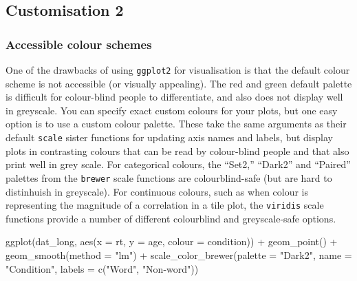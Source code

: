 \documentclass[
  english,
  doc,floatsintext]{apa6}
\newenvironment{Shaded}{\begin{snugshade}}{\end{snugshade}}
\newcommand{\AttributeTok}[1]{\textcolor[rgb]{0.77,0.63,0.00}{#1}}
\newcommand{\FunctionTok}[1]{\textcolor[rgb]{0.00,0.00,0.00}{#1}}
\newcommand{\NormalTok}[1]{#1}
\newcommand{\SpecialCharTok}[1]{\textcolor[rgb]{0.00,0.00,0.00}{#1}}
\newcommand{\StringTok}[1]{\textcolor[rgb]{0.31,0.60,0.02}{#1}}
\begin{document}
\hypertarget{customisation-2}{%
\subsection{Customisation 2}\label{customisation-2}}

\hypertarget{accessible-colour-schemes}{%
\subsubsection{Accessible colour schemes}\label{accessible-colour-schemes}}

One of the drawbacks of using \texttt{ggplot2} for visualisation is that the default colour scheme is not accessible (or visually appealing). The red and green default palette is difficult for colour-blind people to differentiate, and also does not display well in greyscale. You can specify exact custom colours for your plots, but one easy option is to use a custom colour palette. These take the same arguments as their default \texttt{scale} sister functions for updating axis names and labels, but display plots in contrasting colours that can be read by colour-blind people and that also print well in grey scale. For categorical colours, the ``Set2,'' ``Dark2'' and ``Paired'' palettes from the \texttt{brewer} scale functions are colourblind-safe (but are hard to distinhuish in greyscale). For continuous colours, such as when colour is representing the magnitude of a correlation in a tile plot, the \texttt{viridis} scale functions provide a number of different colourblind and greyscale-safe options.

\begin{Shaded}
\begin{Highlighting}[]
\FunctionTok{ggplot}\NormalTok{(dat\_long, }\FunctionTok{aes}\NormalTok{(}\AttributeTok{x =}\NormalTok{ rt, }\AttributeTok{y =}\NormalTok{ age, }\AttributeTok{colour =}\NormalTok{ condition)) }\SpecialCharTok{+}
  \FunctionTok{geom\_point}\NormalTok{() }\SpecialCharTok{+}
  \FunctionTok{geom\_smooth}\NormalTok{(}\AttributeTok{method =} \StringTok{"lm"}\NormalTok{) }\SpecialCharTok{+}
  \FunctionTok{scale\_color\_brewer}\NormalTok{(}\AttributeTok{palette =} \StringTok{"Dark2"}\NormalTok{,}
                     \AttributeTok{name =} \StringTok{"Condition"}\NormalTok{,}
                     \AttributeTok{labels =} \FunctionTok{c}\NormalTok{(}\StringTok{"Word"}\NormalTok{, }\StringTok{"Non{-}word"}\NormalTok{))}
\end{Highlighting}
\end{Shaded}
\end{document}
